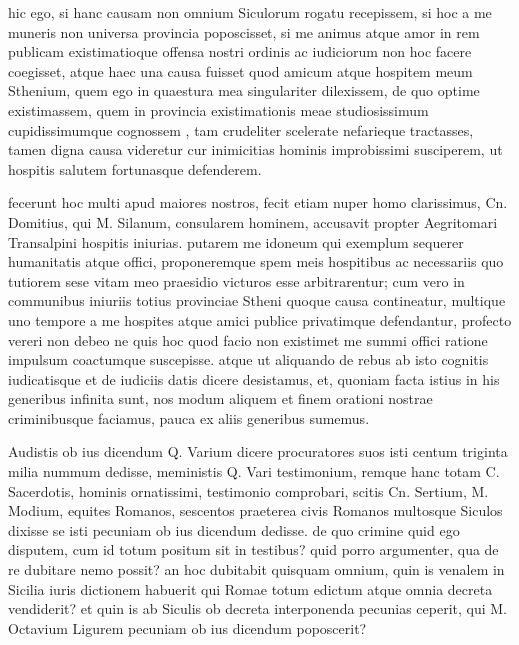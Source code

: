  hic ego, si hanc causam non omnium Siculorum rogatu recepissem, si hoc a me muneris non universa provincia poposcisset, si me animus atque amor in rem publicam existimatioque offensa nostri ordinis ac iudiciorum non hoc facere coegisset, atque haec una causa fuisset quod amicum atque hospitem meum Sthenium, quem ego in quaestura mea singulariter dilexissem, de quo optime existimassem, quem in provincia existimationis meae studiosissimum cupidissimumque cognossem , tam crudeliter scelerate nefarieque tractasses, tamen digna causa videretur cur inimicitias hominis improbissimi susciperem, ut hospitis salutem fortunasque defenderem.

 fecerunt hoc multi apud maiores nostros, fecit etiam nuper homo clarissimus, Cn. Domitius, qui M. Silanum, consularem hominem, accusavit propter Aegritomari Transalpini hospitis iniurias. putarem me idoneum qui exemplum sequerer humanitatis atque offici, proponeremque spem meis hospitibus ac necessariis quo tutiorem sese vitam meo praesidio victuros esse arbitrarentur; cum vero in communibus iniuriis totius provinciae Stheni quoque causa contineatur, multique uno tempore a me hospites atque amici publice privatimque defendantur, profecto vereri non debeo ne quis hoc quod facio non existimet me summi offici ratione impulsum coactumque suscepisse. atque ut aliquando de rebus ab isto cognitis iudicatisque et de iudiciis datis dicere desistamus, et, quoniam facta istius in his generibus infinita sunt, nos modum aliquem et finem orationi nostrae criminibusque faciamus, pauca ex aliis generibus sumemus.

 Audistis ob ius dicendum Q. Varium dicere procuratores suos isti centum triginta milia nummum dedisse, meministis Q. Vari testimonium, remque hanc totam C. Sacerdotis, hominis ornatissimi, testimonio comprobari, scitis Cn. Sertium, M. Modium, equites Romanos, sescentos praeterea civis Romanos multosque Siculos dixisse se isti pecuniam ob ius dicendum dedisse. de quo crimine quid ego disputem, cum id totum positum sit in testibus? quid porro argumenter, qua de re dubitare nemo possit? an hoc dubitabit quisquam omnium, quin is venalem in Sicilia iuris dictionem habuerit qui Romae totum edictum atque omnia decreta vendiderit? et quin is ab Siculis ob decreta interponenda pecunias ceperit, qui M. Octavium Ligurem pecuniam ob ius dicendum poposcerit?

